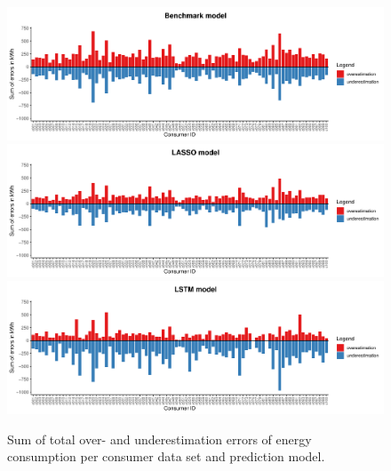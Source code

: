 \begin{figure}
    \centering
    \includegraphics[width=\textwidth]{thesis/graphs/evaluation/c_barplot_naive_overunderestimation.pdf}\\\vspace{.6cm}
    \includegraphics[width=\textwidth]{thesis/graphs/evaluation/c_barplot_LASSO_overunderestimation.pdf}\\\vspace{.6cm}
    \includegraphics[width=\textwidth]{thesis/graphs/evaluation/c_barplot_LSTM_overunderestimation.pdf}
    \caption[Sum of total over- and underestimation errors per consumer data set]{Sum of total over- and underestimation errors of energy consumption per consumer data set and prediction model. \quantnet\href{}{}}
    \label{Fig:overunderestimation}
\end{figure}
%

